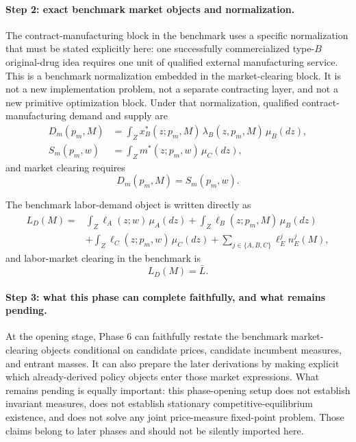 \paragraph{Step 2: exact benchmark market objects and normalization.}
The contract-manufacturing block in the benchmark uses a specific normalization that must be stated explicitly here: one successfully commercialized type-$B$ original-drug idea requires one unit of qualified external manufacturing service. This is a benchmark normalization embedded in the market-clearing block. It is not a new implementation problem, not a separate contracting layer, and not a new primitive optimization block. Under that normalization, qualified contract-manufacturing demand and supply are
\begin{align}
D_m(p_m,M)
&=\int_Z x_B^*(z;p_m,M)\,\lambda_B(z,p_m,M)\,\mu_B(dz),
\label{eq:p6_Dm}\\
S_m(p_m,w)
&=\int_Z m^*(z;p_m,w)\,\mu_C(dz),
\label{eq:p6_Sm}
\end{align}
and market clearing requires
\begin{equation}
D_m(p_m,M)=S_m(p_m,w).
\label{eq:p6_pm_clear}
\end{equation}

The benchmark labor-demand object is written directly as
\begin{equation}
\begin{aligned}
L_D(M)={}&\int_Z \ell_A(z;w)\,\mu_A(dz)
+\int_Z \ell_B(z;p_m,M)\,\mu_B(dz)\\
&+\int_Z \ell_C(z;p_m,w)\,\mu_C(dz)
+\sum_{j\in\{A,B,C\}}\ell_E^j n_E^j(M),
\end{aligned}
\end{equation}
and labor-market clearing in the benchmark is
\begin{equation}
L_D(M)=\bar L.
\end{equation}

\paragraph{Step 3: what this phase can complete faithfully, and what remains pending.}
At the opening stage, Phase 6 can faithfully restate the benchmark market-clearing objects conditional on candidate prices, candidate incumbent measures, and entrant masses. It can also prepare the later derivations by making explicit which already-derived policy objects enter those market expressions. What remains pending is equally important: this phase-opening setup does not establish invariant measures, does not establish stationary competitive-equilibrium existence, and does not solve any joint price-measure fixed-point problem. Those claims belong to later phases and should not be silently imported here.

